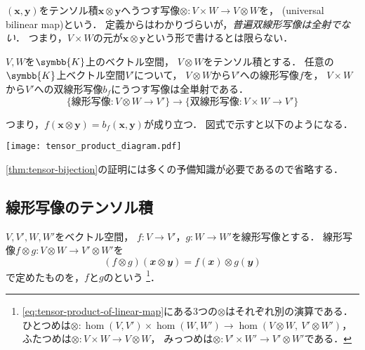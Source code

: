\documentclass[../sotsu.tex]{subfiles}
\begin{document}
$(\symbf{x}, \symbf{y})$をテンソル積$\symbf{x} \otimes \symbf{y}$へうつす写像$\otimes \colon V \times W \to V \otimes W$を，
(universal bilinear map)という．
定義からはわかりづらいが，\emph{普遍双線形写像は全射でない}．
つまり，$V \times W$の元が$\symbf{x} \otimes \symbf{y}$という形で書けるとは限らない．


\begin{theorem}
    \label{thm:tensor-bijection}
    $V, W$を$\symbb{K}$上のベクトル空間，
    $V \otimes W$をテンソル積とする．
    任意の$\symbb{K}$上ベクトル空間$V'$について，
    $V \otimes W$から$V'$への線形写像$f$を，
    $V \times W$から$V'$への双線形写像$b_f$にうつす写像は全単射である．
    \begin{equation*}
        \{ \text{線形写像} \colon  V \otimes W  \to  V' \}
        \to
        \{ \text{双線形写像} \colon  V \times W  \to  V' \}
    \end{equation*}
\end{theorem}

つまり，$f(\symbf{x} \otimes \symbf{y}) = b_f (\symbf{x}, \symbf{y})$が成り立つ．
図式で示すと以下のようになる．

\bigbreak
\begin{minipage}{1.0\linewidth}
    \centering
    \texttt{[image: tensor\_product\_diagram.pdf]}
\end{minipage}
\bigbreak

\cref{thm:tensor-bijection}の証明には多くの予備知識が必要であるので省略する．




\subsection{線形写像のテンソル積}
\label{sec:tensor-product-of-linear-map}

$V, V', W, W'$をベクトル空間，
$f \colon V \to V'$，$g \colon W \to W'$を線形写像とする．
線形写像$f \otimes g \colon V \otimes W \to V' \otimes W'$を
\begin{equation}
    \label{eq:tensor-product-of-linear-map}
    (f \otimes g)(𝒙 \otimes 𝒚)
        = f(𝒙) \otimes g(𝒚)
\end{equation}
で定めたものを，$f$と$g$のという%
\footnote{
    \cref{eq:tensor-product-of-linear-map}にある3つの$\otimes$はそれぞれ別の演算である．
    ひとつめは$\otimes \colon \hom(V, V') \times \hom(W, W') \to \hom ( V \otimes W, \  V' \otimes W' )$，
    ふたつめは$\otimes \colon V \times W \to V \otimes W$，
    みっつめは$\otimes \colon V' \times W' \to V' \otimes W'$である．
}．
\end{document}
